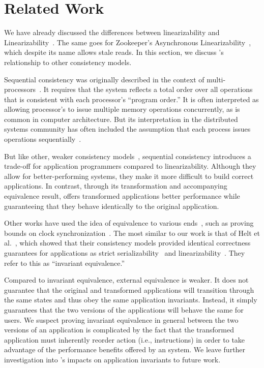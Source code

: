\section{Related Work}
\label{sec:related}


We have already discussed the differences between \multidispatch{}
linearizability and Linearizability~\cite{herlihy1990linearizability}.
The same goes for Zookeeper's Asynchronous
Linearizability~\cite{hunt2010zookeeper}, which despite its name 
allows stale reads. In this section, we discuss \MDL{}'s relationship
to other consistency models.

Sequential consistency was originally described in the context of
multi-processors~\cite{lamport1979sequential}. It requires that
the system reflects a total order over all operations that is 
consistent with each processor's ``program order.'' It is often
interpreted as allowing processor's to issue multiple memory 
operations concurrently, as is common in computer architecture.
But its interpretation in the distributed systems community has often
included the assumption that each process issues operations 
sequentially~\cite{attiya1993seqlin}.

But like other, weaker consistency
models~\cite{ahamad1995causal,lloyd2011cops,terry1995bayou,deCandia2007dynamo}, 
sequential consistency introduces a trade-off for application
programmers compared to linearizability. Although they allow for
better-performing systems, they make it more difficult to build
correct applications. In contrast, through its transformation
and accompanying equivalence result, \MDL{} offers transformed
applications better performance while guaranteeing that they behave 
identically to the original application.


Other works have used the idea of equivalence to various
ends~\cite{goldman1993unifiedModel,lundelius1984clocksync,
fischer1985flp,attiya1993seqlin},
such as proving bounds on clock
synchronization~\cite{lundelius1984clocksync}.
The most similar to our work is that of Helt et
al.~\cite{helt2021rss}, which showed that their consistency
models provided identical correctness guarantees for applications
as strict serializability~\cite{papadimitriou1979serializability} and linearizability~\cite{herlihy1990linearizability}.
They refer to this as ``invariant equivalence.'' 

Compared to invariant equivalence, external equivalence is weaker.
It does not guarantee that the original and transformed applications
will transition through the same states and thus obey the same
application invariants. Instead, it simply guarantees that the two
versions of the applications will behave the same for users.
We suspect proving invariant equivalence in general between the two 
versions of an application is complicated by the fact that the
transformed application must inherently reorder action (i.e., 
instructions) in order to take advantage of the performance benefits
offered by an \MDL{} system. We leave further investigation into
\MDL{}'s impacts on application invariants to future work.

